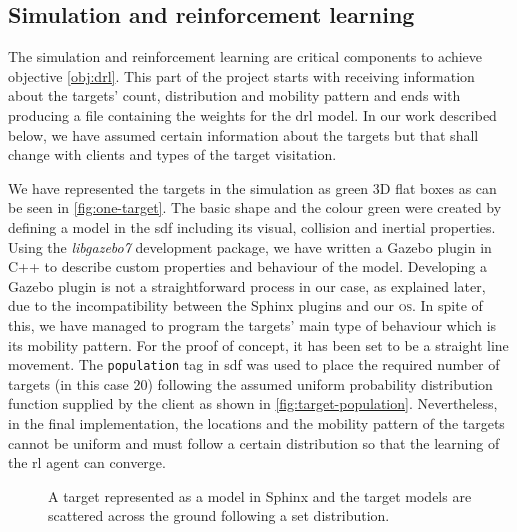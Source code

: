 \documentclass[../main.tex]{subfiles}
\begin{document}
\subsection{Simulation and reinforcement learning}

The simulation and reinforcement learning are critical
components to achieve objective \ref{obj:drl}.
This part of the project starts with receiving
information about the targets' count, distribution
and mobility pattern
and ends with producing a file containing the weights
for the \gls{drl} model.
In our work described below, we have assumed certain
information about the targets but that shall change
with clients and types of the target visitation.

We have represented the targets in the simulation
as green 3D flat boxes
as can be seen in \cref{fig:one-target}. 
The basic shape and the colour green were created by 
defining a model 
in the \gls{sdf}
including its visual, collision and inertial properties.
Using the \textit{libgazebo7} development package, 
we have written a Gazebo plugin 
in C++ to describe custom properties and  
behaviour of the model.
Developing a Gazebo plugin is not a straightforward
process in our case, as explained later, due to 
the incompatibility between the Sphinx plugins and
our \textsc{os}.
In spite of this, we have managed to program the targets' 
main type of behaviour which is its mobility pattern.
For the proof of concept, 
it has been set to be a straight line movement.
The \texttt{population} tag in \gls{sdf} was used 
to place the required number of targets (in this case 20)
following the assumed uniform probability distribution 
function supplied by the
client as shown in \cref{fig:target-population}.
Nevertheless, in the final implementation, the locations 
and the mobility pattern of the targets cannot be uniform
and must follow a certain distribution so that the learning
of the \gls{rl} agent can converge.

\begin{figure}[b]%
    \centering
    \hspace{0.5cm}
    \caption{%
        \protect{} 
        A target represented as a model in Sphinx and
        \protect{} 
        the target models are scattered across
        the ground following a set distribution.}%
    \label{fig:target}%
\end{figure}
\end{document}
